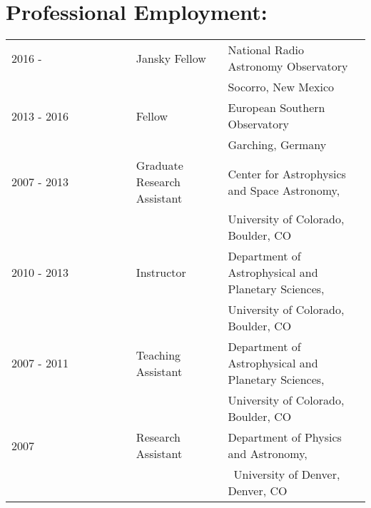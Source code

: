 \setlength{\extrarowheight}{2pt}
\section*{Professional Employment:}
\begin{listliketab}
    \begin{tabular}{lll}
    2016 -      & Jansky Fellow  & National Radio Astronomy Observatory\\
                 &         & Socorro, New Mexico \\
    2013 - 2016 & Fellow  & European Southern Observatory\\
                 &         & Garching, Germany \\
    2007 - 2013 & Graduate Research Assistant & Center for Astrophysics and Space Astronomy, \\
              &                             & University of Colorado, Boulder, CO \\
    2010 - 2013 & Instructor  & Department of Astrophysical and Planetary Sciences, \\
                           && University of Colorado, Boulder, CO \\
    2007 - 2011    & Teaching Assistant & Department of Astrophysical and Planetary Sciences, \\
                                    && University of Colorado, Boulder, CO \\
    2007 & Research Assistant & Department of Physics and Astronomy, \\
                                          && University of Denver, Denver, CO \\
    \end{tabular}
\end{listliketab}

